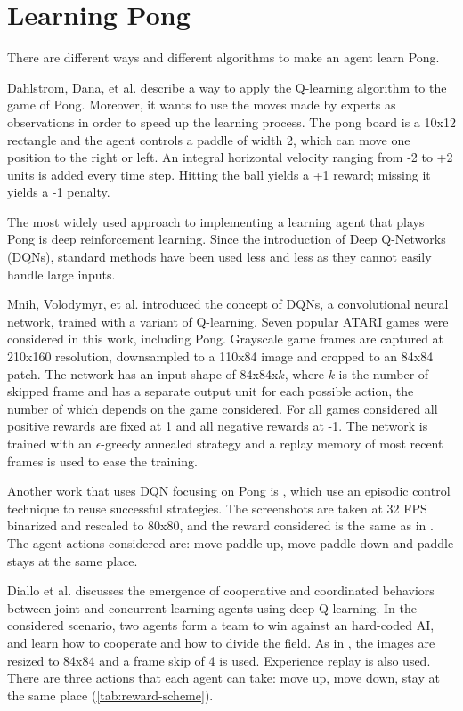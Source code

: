 \section{Learning Pong}
\label{sec:pong}
There are different ways and different algorithms to make an agent learn Pong.

Dahlstrom, Dana, et al. \cite{dahlstrom2002imitative} describe a way to apply the Q-learning algorithm to the game of Pong. Moreover, it wants to use the moves made by experts as observations in order to speed up the learning process. 
The pong board is a 10x12 rectangle and the agent controls a paddle of width 2, which can move one position to the right or left.
An integral horizontal velocity ranging from -2 to +2 units is added every time step. Hitting the ball yields a +1 reward; missing it yields a -1 penalty.

The most widely used approach to implementing a learning agent that plays Pong is deep reinforcement learning.
Since the introduction of Deep Q-Networks (DQNs), standard methods have been used less and less as they cannot easily handle large inputs.

Mnih, Volodymyr, et al. \cite{mnih2013playing} introduced the concept of DQNs, a convolutional neural network, trained with a variant of Q-learning.
Seven popular ATARI games were considered in this work, including Pong.
%
Grayscale game frames are captured at 210x160 resolution, downsampled to a 110x84 image and cropped to an 84x84 patch.
%
The network has an input shape of 84x84x$k$, where $k$ is the number of skipped frame and has a separate output unit for each possible action, 
the number of which depends on the game considered. 
For all games considered all positive rewards are fixed at 1 and all negative rewards at -1.
%
The network is trained with an $\epsilon$-greedy annealed strategy and a replay memory of most recent frames is used to ease the training.

Another work that uses DQN focusing on Pong is \cite{makarov2017learning}, which use an episodic control technique \cite{blundell2016model} to reuse successful
strategies.
%
The screenshots are taken at 32 FPS binarized and rescaled to 80x80, and the reward considered is the same as in \cite{mnih2013playing}.
The agent actions considered are: move paddle up, move paddle down and paddle stays at the same place.

Diallo et al. \cite{diallo2017learning} discusses the emergence of cooperative and coordinated behaviors between joint and concurrent learning
agents using deep Q-learning. 
%
In the considered scenario, two agents form a team to win against an hard-coded AI,
and learn how to cooperate and how to divide the field.
%
As in \cite{mnih2013playing}, the images are resized to 84x84 and a frame skip of 4 is used.
Experience replay is also used.
%
There are three actions that each agent can take: move up, move down, stay at the same place (\cref{tab:reward-scheme}).

